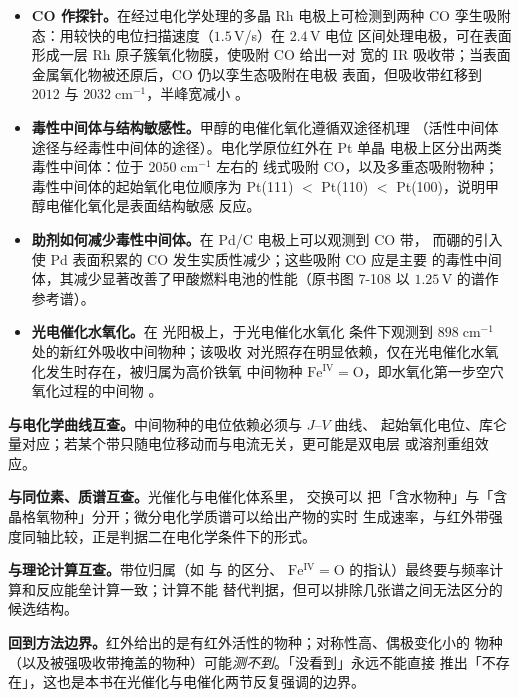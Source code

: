 \begin{itemize}
  \item \textbf{CO 作探针。}在经过电化学处理的多晶 Rh 电极上可检测到两种
        CO 孪生吸附态：用较快的电位扫描速度（$1.5$\,V/s）在 $2.4$\,V 电位
        区间处理电极，可在表面形成一层 Rh 原子簇氧化物膜，使吸附 CO 给出一对
        宽的 IR 吸收带；当表面金属氧化物被还原后，CO 仍以孪生态吸附在电极
        表面，但吸收带红移到 $2012$ 与 $2032\;\mathrm{cm^{-1}}$，半峰宽减小
        。
  \item \textbf{毒性中间体与结构敏感性。}甲醇的电催化氧化遵循双途径机理
        （活性中间体途径与经毒性中间体的途径）。电化学原位红外在 Pt 单晶
        电极上区分出两类毒性中间体：位于 $2050\;\mathrm{cm^{-1}}$ 左右的
        线式吸附 CO，以及多重态吸附物种；毒性中间体的起始氧化电位顺序为
        Pt(111) $<$ Pt(110) $<$ Pt(100)，说明甲醇电催化氧化是表面结构敏感
        反应。
  \item \textbf{助剂如何减少毒性中间体。}在 Pd/C 电极上可以观测到 CO 带，
        而硼的引入使 Pd 表面积累的 CO 发生实质性减少；这些吸附 CO 应是主要
        的毒性中间体，其减少显著改善了甲酸燃料电池的性能（原书图 7-108 以
        $1.25$\,V 的谱作参考谱）。
  \item \textbf{光电催化水氧化。}在  光阳极上，于光电催化水氧化
        条件下观测到 $898\;\mathrm{cm^{-1}}$ 处的新红外吸收中间物种；该吸收
        对光照存在明显依赖，仅在光电催化水氧化发生时存在，被归属为高价铁氧
        中间物种 $\mathrm{Fe^{IV}{=}O}$，即水氧化第一步空穴氧化过程的中间物
        。
\end{itemize}

\begin{crosscheck}
\textbf{与电化学曲线互查。}中间物种的电位依赖必须与 $J$--$V$ 曲线、
起始氧化电位、库仑量对应；若某个带只随电位移动而与电流无关，更可能是双电层
或溶剂重组效应。

\textbf{与同位素、质谱互查。}光催化与电催化体系里， 交换可以
把「含水物种」与「含晶格氧物种」分开；微分电化学质谱可以给出产物的实时
生成速率，与红外带强度同轴比较，正是判据二在电化学条件下的形式。

\textbf{与理论计算互查。}带位归属（如  与  的区分、
$\mathrm{Fe^{IV}{=}O}$ 的指认）最终要与频率计算和反应能垒计算一致；计算不能
替代判据，但可以排除几张谱之间无法区分的候选结构。

\textbf{回到方法边界。}红外给出的是有红外活性的物种；对称性高、偶极变化小的
物种（以及被强吸收带掩盖的物种）可能\emph{测不到}。「没看到」永远不能直接
推出「不存在」，这也是本书在光催化与电催化两节反复强调的边界。
\end{crosscheck}

